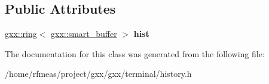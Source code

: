 \subsection*{Public Attributes}
\begin{DoxyCompactItemize}
\item 
\hyperlink{classgxx_1_1ring}{gxx\+::ring}$<$ \hyperlink{classgxx_1_1smart__buffer}{gxx\+::smart\+\_\+buffer} $>$ {\bfseries hist}\hypertarget{classgxx_1_1history_a73e542175fc42e41b43c9e9580ba9d95}{}\label{classgxx_1_1history_a73e542175fc42e41b43c9e9580ba9d95}

\end{DoxyCompactItemize}


The documentation for this class was generated from the following file\+:\begin{DoxyCompactItemize}
\item 
/home/rfmeas/project/gxx/gxx/terminal/history.\+h\end{DoxyCompactItemize}
